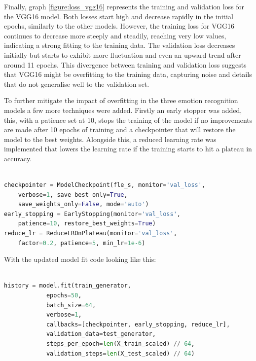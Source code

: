 Finally, graph \ref{figure:loss_vgg16} represents the training and validation loss for the VGG16 model. Both losses start high and decrease rapidly in the initial epochs, similarly to the other models. However, the training loss for VGG16 continues to decrease more steeply and steadily, reaching very low values, indicating a strong fitting to the training data. The validation loss decreases initially but starts to exhibit more fluctuation and even an upward trend after around 11 epochs. This divergence between training and validation loss suggests that VGG16 might be overfitting to the training data, capturing noise and details that do not generalise well to the validation set.

To further mitigate the impact of overfitting in the three emotion recognition models a few more techniques were added. Firstly an early stopper was added, this, with a patience set at 10, stops the training of the model if no improvements are made after 10 epochs of training and a checkpointer that will restore the model to the best weights. Alongside this, a reduced learning rate was implemented that lowers the learning rate if the training starts to hit a plateau in accuracy.

\begin{lstlisting}[language=Python, basicstyle=\ttfamily\footnotesize]

checkpointer = ModelCheckpoint(fle_s, monitor='val_loss',
    verbose=1, save_best_only=True,
    save_weights_only=False, mode='auto')
early_stopping = EarlyStopping(monitor='val_loss',
    patience=10, restore_best_weights=True)
reduce_lr = ReduceLROnPlateau(monitor='val_loss',
    factor=0.2, patience=5, min_lr=1e-6)

\end{lstlisting}

With the updated model fit code looking like this:

\begin{lstlisting}[language=Python, basicstyle=\ttfamily\footnotesize]

history = model.fit(train_generator,
            epochs=50,
            batch_size=64,
            verbose=1,
            callbacks=[checkpointer, early_stopping, reduce_lr],
            validation_data=test_generator,
            steps_per_epoch=len(X_train_scaled) // 64,
            validation_steps=len(X_test_scaled) // 64)

\end{lstlisting}

